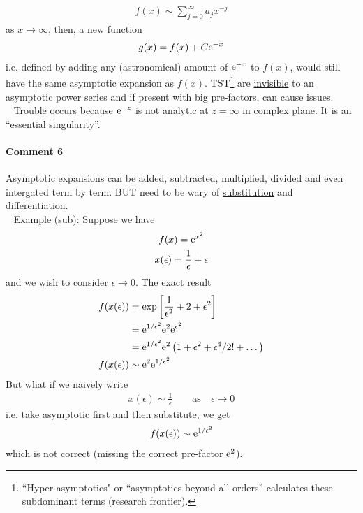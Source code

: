 \begin{gather*}
	f(x) \sim \sum_{j=0}^{\infty} a_j x^{-j}
\end{gather*}
as $x \rightarrow \infty$, then, a new function
\begin{gather*}
	g(x) = f(x) + C\mathrm{e}^{-x}
\end{gather*}
i.e. defined by adding any (astronomical) amount of $\mathrm{e}^{-x}$ to $f(x)$, would still have the same asymptotic expansion as $f(x)$. TST\footnote{``Hyper-asymptotics" or ``asymptotics beyond all orders'' calculates these subdominant terms (research frontier).} are \underline{invisible} to an asymptotic power series and if present with big pre-factors, can cause issues. \\
\ \newline
Trouble occurs because $\mathrm{e}^{-z}$ is not analytic at $z = \infty$ in complex plane. It is an ``essential singularity''. 

\paragraph{Comment 6} Asymptotic expansions can be added, subtracted, multiplied, divided and even intergated term by term. BUT need to be wary of \underline{substitution} and \underline{differentiation}. \\
\ \newline
\underline{Example (sub):} Suppose we have
\begin{gather*}
	f(x) = \mathrm{e}^{x^2} \\
	x(\epsilon) = \frac{1}{\epsilon} + \epsilon
\end{gather*}
and we wish to consider $\epsilon \rightarrow 0$. The exact result
\begin{align*}
	f(x(\epsilon)) &= \exp \left[ \frac{1}{\epsilon^2} + 2 + \epsilon^2\right] \\
	&= \mathrm{e}^{1/\epsilon^2}\mathrm{e}^2 \mathrm{e}^{\epsilon^2} \\
	&= \mathrm{e}^{1/\epsilon^2}\mathrm{e}^2 \left(1 + \epsilon^2 + {\epsilon^4}/{2!} + \dots \right) \\
	f(x(\epsilon)) & \sim \mathrm{e}^2 \mathrm{e}^{1/\epsilon^2}
\end{align*}
But what if we naively write
\begin{gather*}
	x(\epsilon) \sim \frac{1}{\epsilon} \qquad \text{as} \quad \epsilon \rightarrow 0
\end{gather*}
i.e. take asymptotic first and then substitute, we get
\begin{gather*}
	f(x(\epsilon)) \sim \mathrm{e}^{{1}/{\epsilon^2}}
\end{gather*}
which is not correct (missing the correct pre-factor $\mathrm{e}^2$).

